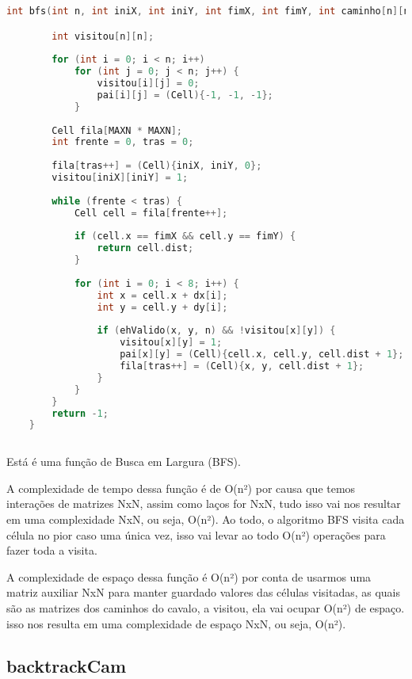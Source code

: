 \documentclass[relatorio]{IEEEtran}
\begin{document}
\begin{lstlisting}[language=C]
    int bfs(int n, int iniX, int iniY, int fimX, int fimY, int caminho[n][n], Cell pai[n][n]) {

        int visitou[n][n];
    
        for (int i = 0; i < n; i++)
            for (int j = 0; j < n; j++) {
                visitou[i][j] = 0;
                pai[i][j] = (Cell){-1, -1, -1};
            }
    
        Cell fila[MAXN * MAXN];
        int frente = 0, tras = 0;
    
        fila[tras++] = (Cell){iniX, iniY, 0};
        visitou[iniX][iniY] = 1;
    
        while (frente < tras) {
            Cell cell = fila[frente++];
    
            if (cell.x == fimX && cell.y == fimY) {
                return cell.dist;
            }
    
            for (int i = 0; i < 8; i++) {
                int x = cell.x + dx[i];
                int y = cell.y + dy[i];
    
                if (ehValido(x, y, n) && !visitou[x][y]) {
                    visitou[x][y] = 1;
                    pai[x][y] = (Cell){cell.x, cell.y, cell.dist + 1};
                    fila[tras++] = (Cell){x, y, cell.dist + 1};
                }
            }
        }
        return -1;
    }
    
\end{lstlisting}

Está é uma função de Busca em Largura (BFS).

A complexidade de tempo dessa função é de O(n²) por causa que temos interações de matrizes NxN, assim como laços for NxN, tudo isso vai nos resultar em uma complexidade NxN, ou seja, O(n²). Ao todo, o algoritmo BFS visita cada célula no pior caso uma única vez, isso vai levar ao todo O(n²) operações para fazer toda a visita.

A complexidade de espaço dessa função é O(n²) por conta de usarmos uma matriz auxiliar NxN para manter guardado valores das células visitadas, as quais são as matrizes dos caminhos do cavalo, a visitou, ela vai ocupar O(n²) de espaço. isso nos resulta em uma complexidade de espaço NxN, ou seja, O(n²).

\subsection{backtrackCam}
\end{document}
